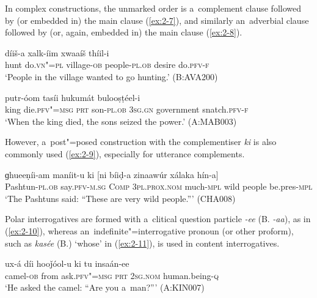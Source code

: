 In complex constructions, the unmarked order is a~complement clause followed by (or embedded in) the main clause (\ref{ex:2-7}), and similarly an~adverbial clause followed by (or, again, embedded in) the main clause (\ref{ex:2-8}). 

\begin{exe}
\ex
\label{ex:2-7}
 díiš-a xalk-íim xwaaíš thíil-i \\
	hunt do.\textsc{vn"=pl} village\textsc{-ob} people\textsc{-pl.ob} desire do.\textsc{pfv-f} \\
\glt `People in the village wanted to go hunting.' (B:AVA200)
\end{exe}

\begin{exe}
\ex
\label{ex:2-8}
 putr-óom tasíi hukumát bulooṣṭéel-i \\
	king die.\textsc{pfv"=msg} \textsc{prt} son\textsc{-pl.ob} \textsc{3sg.gn} government snatch.\textsc{pfv-f} \\
\glt `When the king died, the sons seized the power.' (A:MAB003)
\end{exe}

However, a~post"=posed construction with the complementiser \textit{ki} is also commonly used (\ref{ex:2-9}), especially for utterance complements.

\begin{exe}
\ex
\label{ex:2-9}
\gll ɡhueeṇíi-am maníit-u ki [ni bíiḍ-a zinaawúr xálaka hín-a] \\
	Pashtun-\textsc{pl.ob} say.\textsc{pfv-m.sg} \textsc{Comp} \textsc{3pl.prox.nom} much-\textsc{mpl} wild people be.pres-\textsc{mpl} \\
\glt `The Pashtuns said: ``These are very wild people.''' (CHA008)
\end{exe}

Polar interrogatives are formed with a~clitical question particle \textit{-ee} (B. \textit{-aa}), as in (\ref{ex:2-10}), whereas an~indefinite"=interrogative pronoun (or other proform), such as \textit{kasée} (B.) `whose' in (\ref{ex:2-11}), is used in content interrogatives. 

\begin{exe}
\ex
\label{ex:2-10}
\gll ux-á díi hooǰóol-u ki tu insaán-ee \\
	camel-\textsc{ob} from ask.\textsc{pfv"=msg} \textsc{prt} \textsc{2sg.nom} human.being-\textsc{q} \\
\glt `He asked the camel: ``Are you a~man?''' (A:KIN007)
\end{exe}


